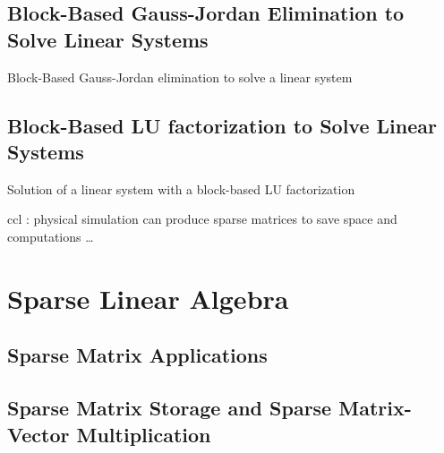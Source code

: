\subsection{Block-Based Gauss-Jordan Elimination to Solve Linear Systems}

\begin{algorithm}[h]
	\DontPrintSemicolon
	\caption{Block-Based Gauss-Jordan elimination to solve a linear system \label{alg:bgj} }
\end{algorithm}

\subsection{Block-Based LU factorization to Solve Linear Systems}


\begin{algorithm}[h]
	\DontPrintSemicolon
	\caption{Solution of a linear system with a block-based LU factorization\label{alg:lufact_sls}}
	\;
\end{algorithm}


ccl : physical simulation can produce sparse matrices to save space and computations \dots
\section{Sparse Linear Algebra}

\subsection{Sparse Matrix Applications}
\subsection{Sparse Matrix Storage and Sparse Matrix-Vector Multiplication}

